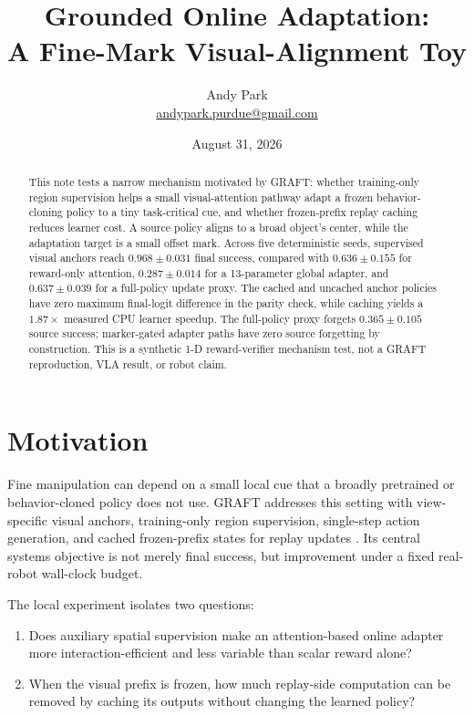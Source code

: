 \documentclass[11pt]{article}
\title{Grounded Online Adaptation:\\A Fine-Mark Visual-Alignment Toy}
\author{Andy Park\\\href{mailto:andypark.purdue@gmail.com}{andypark.purdue@gmail.com}}
\date{August 31, 2026}
\begin{document}
\setlength{\emergencystretch}{3em}
\maketitle

\begin{abstract}
This note tests a narrow mechanism motivated by GRAFT: whether training-only region supervision helps a small visual-attention pathway adapt a frozen behavior-cloning policy to a tiny task-critical cue, and whether frozen-prefix replay caching reduces learner cost. A source policy aligns to a broad object's center, while the adaptation target is a small offset mark. Across five deterministic seeds, supervised visual anchors reach $0.968\pm0.031$ final success, compared with $0.636\pm0.155$ for reward-only attention, $0.287\pm0.014$ for a 13-parameter global adapter, and $0.637\pm0.039$ for a full-policy update proxy. The cached and uncached anchor policies have zero maximum final-logit difference in the parity check, while caching yields a $1.87\times$ measured CPU learner speedup. The full-policy proxy forgets $0.365\pm0.105$ source success; marker-gated adapter paths have zero source forgetting by construction. This is a synthetic 1-D reward-verifier mechanism test, not a GRAFT reproduction, VLA result, or robot claim.
\end{abstract}

\section{Motivation}

Fine manipulation can depend on a small local cue that a broadly pretrained or behavior-cloned policy does not use. GRAFT addresses this setting with view-specific visual anchors, training-only region supervision, single-step action generation, and cached frozen-prefix states for replay updates \cite{graft}. Its central systems objective is not merely final success, but improvement under a fixed real-robot wall-clock budget.

The local experiment isolates two questions:
\begin{enumerate}[leftmargin=1.5em]
  \item Does auxiliary spatial supervision make an attention-based online adapter more interaction-efficient and less variable than scalar reward alone?
  \item When the visual prefix is frozen, how much replay-side computation can be removed by caching its outputs without changing the learned policy?
\end{enumerate}
\end{document}
